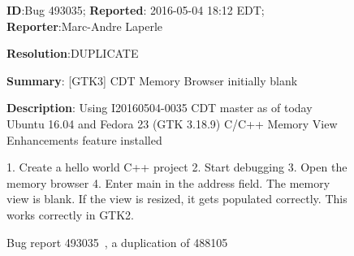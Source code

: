 




\begin{figure}
\sf
\small
\textbf{ID}:Bug 493035; \textbf{Reported}: 2016-05-04 18:12 EDT; \textbf{Reporter}:Marc-Andre Laperle

\textbf{Resolution}:DUPLICATE

\textbf{Summary}: [GTK3] CDT Memory Browser initially blank

\textbf{Description}: 
Using I20160504-0035
CDT master as of today
Ubuntu 16.04 and Fedora 23 (GTK 3.18.9)
C/C++ Memory View Enhancements feature installed

1. Create a hello world C++ project
2. Start debugging
3. Open the memory browser
4. Enter main in the address field. The memory view is blank.
If the view is resized, it gets populated correctly. This works correctly in GTK2.
\caption{Bug report 493035~\cite{bug493035}, a duplication of 488105}
\label{fig:br2}
\end{figure}




